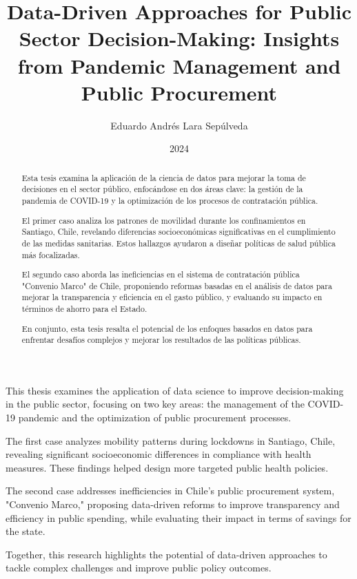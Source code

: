 \documentclass[upright, contnum]{umemoriaENG}
\author{Eduardo Andrés Lara Sepúlveda}
\title{Data-Driven Approaches for Public Sector Decision-Making: Insights from Pandemic Management and Public Procurement}
\date{2024}
\begin{document}
\frontmatter
\maketitle

\begin{abstract}

Esta tesis examina la aplicación de la ciencia de datos para mejorar la toma de decisiones en el sector público, enfocándose en dos áreas clave: la gestión de la pandemia de COVID-19 y la optimización de los procesos de contratación pública.

El primer caso analiza los patrones de movilidad durante los confinamientos en Santiago, Chile, revelando diferencias socioeconómicas significativas en el cumplimiento de las medidas sanitarias. Estos hallazgos ayudaron a diseñar políticas de salud pública más focalizadas.

El segundo caso aborda las ineficiencias en el sistema de contratación pública "Convenio Marco" de Chile, proponiendo reformas basadas en el análisis de datos para mejorar la transparencia y eficiencia en el gasto público, y evaluando su impacto en términos de ahorro para el Estado.

En conjunto, esta tesis resalta el potencial de los enfoques basados en datos para enfrentar desafíos complejos y mejorar los resultados de las políticas públicas.
    
\end{abstract}

\begin{abstractEng}

This thesis examines the application of data science to improve decision-making in the public sector, focusing on two key areas: the management of the COVID-19 pandemic and the optimization of public procurement processes.

The first case analyzes mobility patterns during lockdowns in Santiago, Chile, revealing significant socioeconomic differences in compliance with health measures. These findings helped design more targeted public health policies.

The second case addresses inefficiencies in Chile's public procurement system, "Convenio Marco," proposing data-driven reforms to improve transparency and efficiency in public spending, while evaluating their impact in terms of savings for the state.

Together, this research highlights the potential of data-driven approaches to tackle complex challenges and improve public policy outcomes.
\end{abstractEng} 
\end{document}
